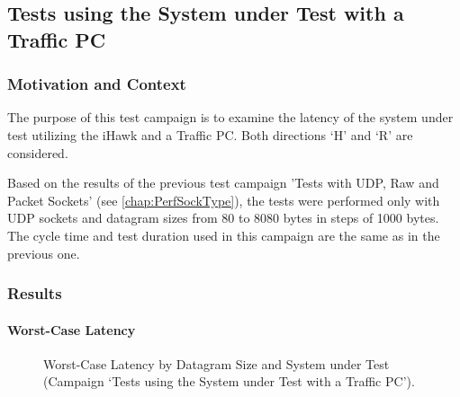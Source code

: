 \subsection{Tests using the System under Test with a Traffic PC}

\subsubsection{Motivation and Context}
The purpose of this test campaign is to examine the latency of the system under test utilizing the iHawk and a Traffic PC. Both directions `H' and `R' are considered.

Based on the results of the previous test campaign 'Tests with UDP, Raw and Packet Sockets' (see \ref{chap:PerfSockType}), the tests were performed only with UDP sockets and datagram sizes from 80 to 8080 bytes in steps of 1000 bytes. The cycle time and test duration used in this campaign are the same as in the previous one.

\subsubsection{Results}
\paragraph{Worst-Case Latency}

\begin{figure}[h!]
  \centering
  \caption{Worst-Case Latency by Datagram Size and System under Test (Campaign `Tests using the System under Test with a Traffic PC').}
  \label{fig:TrafficWc}
\end{figure}

